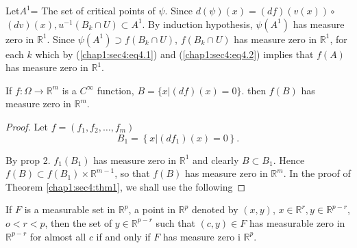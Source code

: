 
Let\pageoriginale $A^1$= The set of critical points of $\psi $. Since $d (\psi )(x)
= (df) (v(x))\circ$  $(dv) (x), u^{-1} (B_k \cap U) \subset A^1$. By induction
hypothesis, $\psi (A^1)$ has measure zero in $\mathbb{R}^1$. Since
$\psi (A^1) \supset f (B_k \cap U)$, $f (B_k \cap U)$ has measure zero
in $\mathbb{R}^1$, for each $k$ which by
(\ref{chap1:sec4:eq4.1}) and (\ref{chap1:sec4:eq4.2}) implies that $f(A)$ has measure zero in
$\mathbb{R}^1$.  

\begin{coro*}%
  If $f : \Omega \to \mathbb{R}^m$ is a $C^\infty$ function, $B =
  \big\{ x \big| (df) (x) = 0\big\}$. then $f (B)$  has measure zero
  in $\mathbb{R}^m$.  
\end{coro*}

\begin{proof}%
  Let $f = (f_1 , f_2 , \ldots , f_m)$ 
  $$
  B_1 = \left\{ x \big| (df_1) (x) = 0 \right\}.
  $$
  
  By prop 2. $f_1 (B_1)$ has measure zero in $\mathbb{R}^1$ and
  clearly $B \subset B_1$. Hence $f(B) \subset f (B_1) \times
  \mathbb{R}^{ m - 1}$, so that $f(B)$ has measure zero in
  $\mathbb{R}^m$. In the proof of Theorem \ref{chap1:sec4:thm1}, we
  shall use the following 
\end{proof}

\begin{theorem*}[(Fubini)]%
  If $F$ is a measurable set in $\mathbb{R}^p$, a point in
  $\mathbb{R}^p$ denoted by $(x, y)$, $x\in \mathbb{R}^r, y \in
  \mathbb{R}^{p-r}$,  $o
  <r < p$, then the set of $y \in \mathbb{R}^{ p - r}$ such that $(c,
  y) \in F$ has measurable zero in $\mathbb{R}^{ p- r}$ for almost all
  $c$ if and only if $F$ has measure zero i $\mathbb{R}^p$. 
\end{theorem*}


